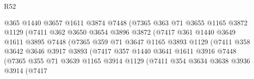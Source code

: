 \begin{lexlean}{R52}
\begin{coremodule}
                              @365
                              @1440
                              @3657
                              @1611
                              @3874
                              @7448
                              (@7365
                                @363
                                @71
                                @3655
                                @1165
                                @3872
                                @1129
                                (@7411
                                  @362
                                  @3650
                                  @3654
                                  @3896
                                  @3872
                                  (@7417
                                    @361
                                    @1440
                                    @3649
                                    @1611
                                    @3895
                                    @7448
                                    (@7365
                                      @359
                                      @71
                                      @3647
                                      @1165
                                      @3893
                                      @1129
                                      (@7411
                                        @358
                                        @3642
                                        @3646
                                        @3917
                                        @3893
                                        (@7417
                                          @357
                                          @1440
                                          @3641
                                          @1611
                                          @3916
                                          @7448
                                          (@7365
                                            @355
                                            @71
                                            @3639
                                            @1165
                                            @3914
                                            @1129
                                            (@7411
                                              @354
                                              @3634
                                              @3638
                                              @3936
                                              @3914
                                              (@7417

\end{coremodule}
\end{lexlean}
